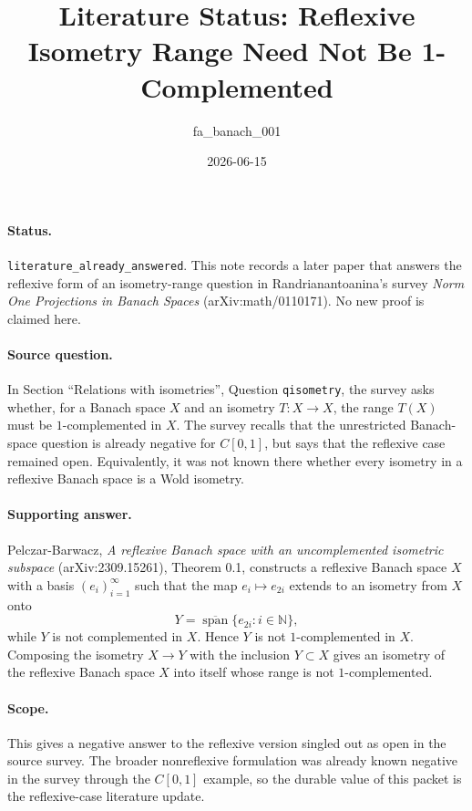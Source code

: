 \documentclass[11pt]{article}
\title{Literature Status: Reflexive Isometry Range Need Not Be 1-Complemented}
\author{fa\_banach\_001}
\date{2026-06-15}
\begin{document}
\maketitle

\paragraph{Status.}
\texttt{literature\_already\_answered}.  This note records a later paper
that answers the reflexive form of an isometry-range question in
Randrianantoanina's survey \emph{Norm One Projections in Banach Spaces}
(arXiv:math/0110171).  No new proof is claimed here.

\paragraph{Source question.}
In Section ``Relations with isometries'', Question \texttt{qisometry}, the
survey asks whether, for a Banach space \(X\) and an isometry
\(T:X\to X\), the range \(T(X)\) must be \(1\)-complemented in \(X\).
The survey recalls that the unrestricted Banach-space question is already
negative for \(C[0,1]\), but says that the reflexive case remained open.
Equivalently, it was not known there whether every isometry in a reflexive
Banach space is a Wold isometry.

\paragraph{Supporting answer.}
Pelczar-Barwacz, \emph{A reflexive Banach space with an uncomplemented
isometric subspace} (arXiv:2309.15261), Theorem 0.1, constructs a reflexive
Banach space \(X\) with a basis \((e_i)_{i=1}^{\infty}\) such that the map
\(e_i\mapsto e_{2i}\) extends to an isometry from \(X\) onto
\[
Y=\overline{\operatorname{span}}\{e_{2i}:i\in\mathbb N\},
\]
while \(Y\) is not complemented in \(X\).  Hence \(Y\) is not
\(1\)-complemented in \(X\).  Composing the isometry \(X\to Y\) with the
inclusion \(Y\subset X\) gives an isometry of the reflexive Banach space
\(X\) into itself whose range is not \(1\)-complemented.

\paragraph{Scope.}
This gives a negative answer to the reflexive version singled out as open in
the source survey.  The broader nonreflexive formulation was already known
negative in the survey through the \(C[0,1]\) example, so the durable value of
this packet is the reflexive-case literature update.
\end{document}
